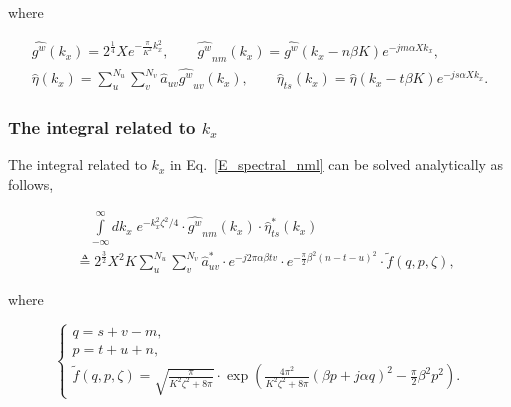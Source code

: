 \documentclass[preprint,12pt]{elsarticle}
\begin{document}
where 
\begin{small}
\begin{equation}
\begin{array}{ll}
{\widehat{g^w}} (k_{x}) = 2^{\frac{1}{4}} X e^{- \frac{\pi}{K^2}k^2_{x}}, \qquad  
{\widehat{g^w}_{nm}}(k_{x}) ={ \widehat{g^w}}(k_{x} - n\beta K)e^{-jm\alpha Xk_{x}}, \\
\widehat{\eta}(k_{x}) = \sum \limits^{N_{u}}_{u}  \sum \limits^{N_{v}}_{v} \widehat{a}_{u v} {\widehat{g^w}_{u v}}(k_{x}),
 \qquad
\widehat{\eta}_{ts}(k_{x}) = \widehat{\eta}(k_{x} - t\beta K)e^{-js\alpha X k_{x}}.
\end{array}
\end{equation}
\end{small}
\subsubsection{The integral related to $k_{x}$}
\label{integral_kx_spectral}
 The integral related to $k_{x}$ in Eq.~\eqref{E_spectral_nml} can be solved analytically as follows, 
 \begin{small}
 \begin{equation}
 \begin{split}
 &\quad   \int \limits^{\infty}_{-\infty} dk_{x} \; e^{-k^2_{x}\zeta^2/4} \cdot  {\widehat{g^w}_{nm}}(k_{x}) \cdot \widehat{\eta}^*_{ts}(k_{x})  \\
 &\triangleq 2^{\frac{3}{2}}X^2K \sum^{N_{u}}_{u} \sum^{N_{v}}_{v} \widehat{a}^*_{uv} \cdot e^{-j2\pi \alpha \beta t v} \cdot e^{-\frac{\pi}{2}\beta^2 (n-t -u)^2} \cdot \widetilde{f}(q,p,\zeta),
 \end{split}
 \end{equation}
 \end{small}
 where
 \begin{small}
 \begin{equation}
 \left\{
 \begin{array}{ll}
 q = s + v - m ,\\
 p = t + u + n , \\
 \widetilde{f}(q, p, \zeta) = \sqrt{ \frac{\pi}{K^2\zeta^2 + 8\pi}}\cdot  \exp \left( \frac{4\pi^2}{K^2\zeta^2+8\pi}(\beta p + j\alpha q)^2 - \frac{\pi}{2}\beta^2p^2 \right) .
 \end{array}\right.
 \end{equation}
 \end{small}
 

\end{document}
